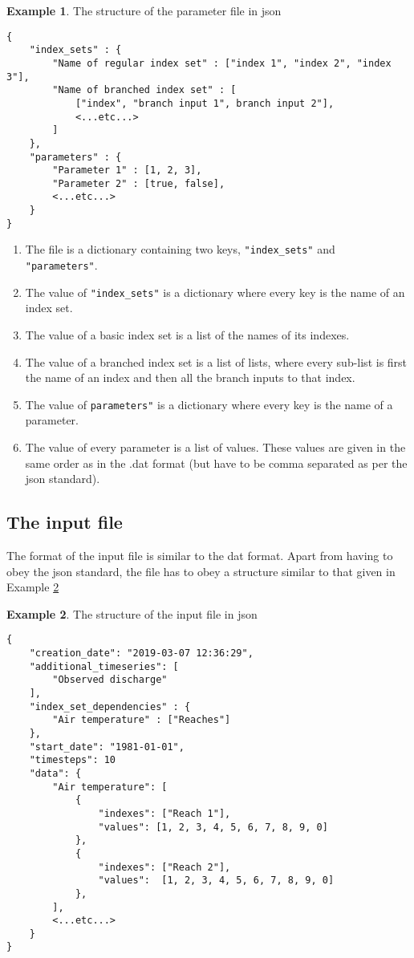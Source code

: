 \documentclass[11pt]{article}
\theoremstyle{definition}
\newtheorem{myexample}{Example}
\newenvironment{example}%
  {\begin{lrbox}{\examplebox}%
   \begin{minipage}{\dimexpr\linewidth-2\fboxsep}
   \begin{myexample}}%
  {\end{myexample}%
   \end{minipage}%
   \end{lrbox}%
   \begin{trivlist}
     \item[]\colorbox{silver}{\usebox\examplebox}
   \end{trivlist}}
\begin{document}
\begin{example}\label{ex:jsonpar}
The structure of the parameter file in json
\begin{lstlisting}
{
	"index_sets" : {
		"Name of regular index set" : ["index 1", "index 2", "index 3"],
		"Name of branched index set" : [
			["index", "branch input 1", branch input 2"],
			<...etc...>
		]
	},
	"parameters" : {
		"Parameter 1" : [1, 2, 3],
		"Parameter 2" : [true, false],
		<...etc...>
	}
}
\end{lstlisting}
\end{example}

\begin{enumerate}[i]
\item The file is a dictionary containing two keys, {\tt "index\_sets"} and {\tt "parameters"}.
\item The value of {\tt "index\_sets"} is a dictionary where every key is the name of an index set.
\item The value of a basic index set is a list of the names of its indexes.
\item The value of a branched index set is a list of lists, where every sub-list is first the name of an index and then all the branch inputs to that index.
\item The value of {\tt parameters"} is a dictionary where every key is the name of a parameter.
\item The value of every parameter is a list of values. These values are given in the same order as in the .dat format (but have to be comma separated as per the json standard).
\end{enumerate}

\subsection{The input file}
The format of the input file is similar to the dat format. Apart from having to obey the json standard, the file has to obey a structure similar to that given in Example \ref{ex:jsonin}

\begin{example}\label{ex:jsonin}
The structure of the input file in json
\begin{lstlisting}
{
	"creation_date": "2019-03-07 12:36:29",
	"additional_timeseries": [
		"Observed discharge"
	],
	"index_set_dependencies" : {
		"Air temperature" : ["Reaches"]
	},
	"start_date": "1981-01-01",
	"timesteps": 10
	"data": {
		"Air temperature": [
			{
				"indexes": ["Reach 1"],
				"values": [1, 2, 3, 4, 5, 6, 7, 8, 9, 0]
			},
			{
				"indexes": ["Reach 2"],
				"values":  [1, 2, 3, 4, 5, 6, 7, 8, 9, 0]
			},
		],
		<...etc...>
	}
}
\end{lstlisting}
\end{example}
\end{document}
